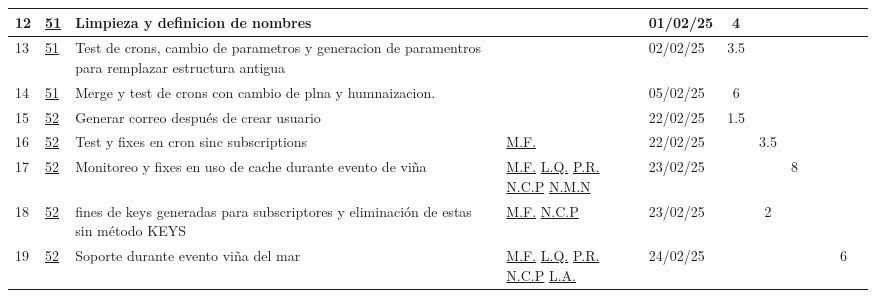 \documentclass{article}
\begin{document}
\begin{longtable}{|m{0.3cm}|m{1cm}|p{3cm}|m{1.5cm}|m{1.3cm}||c|c|c|c|c|c|c| |}
                 \label{12}12  &  \hyperref[51]{\color{blue}51}  & Limpieza y definicion de nombres &  
                 & 01/02/25   & 4 &  &  &  &  &  & \\ \hline 

                 \label{13}13  &  \hyperref[51]{\color{blue}51}  & Test de crons, cambio de parametros y generacion de paramentros para remplazar estructura antigua &  
                 & 02/02/25   & 3.5 &  &  &  &  &  & \\ \hline 

                 \label{14}14  &  \hyperref[51]{\color{blue}51}  & Merge y test de crons con cambio de plna y humnaizacion. &  
                 & 05/02/25   & 6 &  &  &  &  &  & \\ \hline 

                 \label{15}15  &  \hyperref[52]{\color{blue}52}  & Generar correo después de crear usuario &  
                 & 22/02/25   & 1.5 &  &  &  &  &  & \\ \hline 

                 \label{16}16  &  \hyperref[52]{\color{blue}52}  & Test y fixes en cron sinc subscriptions &  
                  \hyperref[M.F.]{\color{blue}M.F.}  & 22/02/25   &  & 3.5 &  &  &  &  & \\ \hline 

                 \label{17}17  &  \hyperref[52]{\color{blue}52}  & Monitoreo y fixes en uso de cache durante evento de viña &  
                  \hyperref[M.F.]{\color{blue}M.F.} \newline  \hyperref[L.Q.]{\color{blue}L.Q.} \newline  \hyperref[P.R.]{\color{blue}P.R.} \newline  \hyperref[N.C.P]{\color{blue}N.C.P} \newline  \hyperref[N.M.N]{\color{blue}N.M.N}  & 23/02/25   &  &  & 8 &  &  &  & \\ \hline 

                 \label{18}18  &  \hyperref[52]{\color{blue}52}  & fines de keys generadas para subscriptores y eliminación de estas sin método KEYS &  
                  \hyperref[M.F.]{\color{blue}M.F.} \newline  \hyperref[N.C.P]{\color{blue}N.C.P}  & 23/02/25   &  & 2 &  &  &  &  & \\ \hline 

                 \label{19}19  &  \hyperref[52]{\color{blue}52}  & Soporte durante evento viña del mar &  
                  \hyperref[M.F.]{\color{blue}M.F.} \newline  \hyperref[L.Q.]{\color{blue}L.Q.} \newline  \hyperref[P.R.]{\color{blue}P.R.} \newline  \hyperref[N.C.P]{\color{blue}N.C.P} \newline  \hyperref[L.A.]{\color{blue}L.A.}  & 24/02/25   &  &  &  &  &  & 6 & \\ \hline 


\end{longtable}
\end{document}
